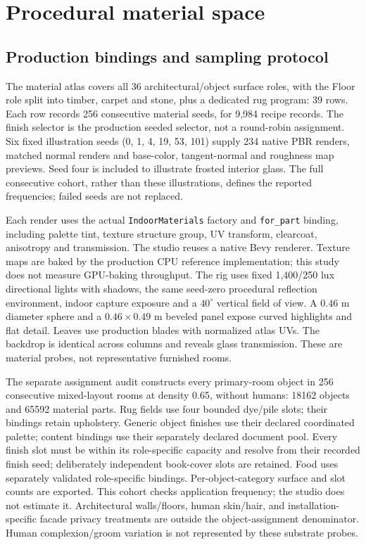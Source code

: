 \clearpage
\section{Procedural material space}
\label{sec:material-space}
\subsection{Production bindings and sampling protocol}
The material atlas covers all 36 architectural/object surface roles, with the Floor role split into timber, carpet and stone, plus a dedicated rug program: 39 rows. Each row records 256 consecutive material seeds, for 9,984 recipe records. The finish selector is the production seeded selector, not a round-robin assignment. Six fixed illustration seeds (0, 1, 4, 19, 53, 101) supply 234 native PBR renders, matched normal renders and base-color, tangent-normal and roughness map previews. Seed four is included to illustrate frosted interior glass. The full consecutive cohort, rather than these illustrations, defines the reported frequencies; failed seeds are not replaced.

Each render uses the actual \texttt{IndoorMaterials} factory and \texttt{for\_part} binding, including palette tint, texture structure group, UV transform, clearcoat, anisotropy and transmission. The studio reuses a native Bevy renderer. Texture maps are baked by the production CPU reference implementation; this study does not measure GPU-baking throughput. The rig uses fixed 1,400/250 lux directional lights with shadows, the same seed-zero procedural reflection environment, indoor capture exposure and a $40^\circ$ vertical field of view. A 0.46 m diameter sphere and a $0.46\times0.49$ m beveled panel expose curved highlights and flat detail. Leaves use production blades with normalized atlas UVs. The backdrop is identical across columns and reveals glass transmission. These are material probes, not representative furnished rooms.

The separate assignment audit constructs every primary-room object in 256 consecutive mixed-layout rooms at density 0.65, without humans: 18162 objects and 65592 material parts. Rug fields use four bounded dye/pile slots; their bindings retain upholstery. Generic object finishes use their declared coordinated palette; content bindings use their separately declared document pool. Every finish slot must be within its role-specific capacity and resolve from their recorded finish seed; deliberately independent book-cover slots are retained. Food uses separately validated role-specific bindings. Per-object-category surface and slot counts are exported. This cohort checks application frequency; the studio does not estimate it. Architectural walls/floors, human skin/hair, and installation-specific facade privacy treatments are outside the object-assignment denominator. Human complexion/groom variation is not represented by these substrate probes.

